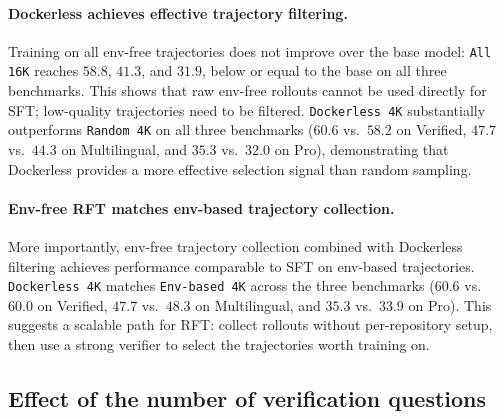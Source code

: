 \documentclass[]{arxiv_template}
\newcommand{\approach}{Dockerless\xspace}
\begin{document}
\paragraph{\approach achieves effective trajectory filtering.}
Training on all env-free trajectories does not improve over the base model: \texttt{All 16K} reaches $58.8$, $41.3$, and $31.9$, below or equal to the base on all three benchmarks.
This shows that raw env-free rollouts cannot be used directly for SFT; low-quality trajectories need to be filtered.
\texttt{\approach 4K} substantially outperforms \texttt{Random 4K} on all three benchmarks ($60.6$ vs.\ $58.2$ on Verified, $47.7$ vs.\ $44.3$ on Multilingual, and $35.3$ vs.\ $32.0$ on Pro), 
demonstrating that \approach provides a more effective selection signal than random sampling.

\paragraph{Env-free RFT matches env-based trajectory collection.}
More importantly, env-free trajectory collection combined with \approach filtering achieves performance comparable to SFT on env-based trajectories.
\texttt{\approach 4K} matches \texttt{Env-based 4K} across the three benchmarks ($60.6$ vs.\ $60.0$ on Verified, $47.7$ vs.\ $48.3$ on Multilingual, and $35.3$ vs.\ $33.9$ on Pro).
This suggests a scalable path for RFT: collect rollouts without per-repository setup, then use a strong verifier to select the trajectories worth training on.

\subsection{Effect of the number of verification questions}
\label{sec:question-ablation}
\end{document}
